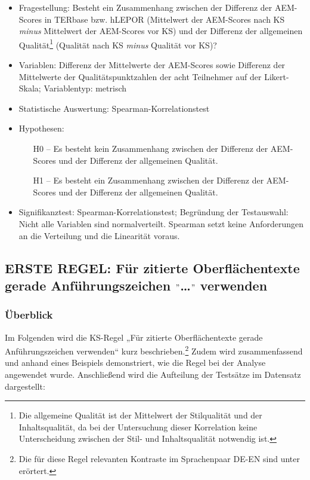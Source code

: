 \begin{itemize}
\item Fragestellung: Besteht ein Zusammenhang zwischen der Differenz der AEM-Scores in TERbase bzw. hLEPOR (Mittelwert der AEM-Scores nach KS \textit{minus} Mittelwert der AEM-Scores vor KS) und der Differenz der allgemeinen Qualität\footnote{{{{Die allgemeine Qualität ist der Mittelwert der Stilqualität und der Inhaltsqualität, da bei der Untersuchung dieser Korrelation keine Unterscheidung zwischen der Stil- und Inhaltsqualität notwendig ist.}}}} (Qualität nach KS \textit{minus} Qualität vor KS)?
\item Variablen: Differenz der Mittelwerte der AEM-Scores sowie Differenz der Mittelwerte der Qualitätspunktzahlen der acht Teilnehmer auf der Likert-Skala; Variablentyp: metrisch
\item Statistische Auswertung: Spearman-Korrelationstest
\item Hypothesen:
  \begin{itemize}[align = left]

  \item[H0 --] Es besteht kein Zusammenhang zwischen der Differenz der AEM-Scores und der Differenz der allgemeinen Qualität.

  \item[H1 --] Es besteht ein Zusammenhang zwischen der Differenz der AEM-Scores und der Differenz der allgemeinen Qualität.

  \end{itemize}
\item Signifikanztest: Spearman-Korrelationstest; Begründung der Testauswahl: Nicht alle Variablen sind normalverteilt. Spearman setzt keine Anforderungen an die Verteilung und die Linearität voraus.
\end{itemize}

\subsection{ERSTE REGEL: Für zitierte Oberflächentexte gerade Anführungszeichen $"$…$"$ verwenden}
\label{sec:5.3.1}

\subsubsection{\label{sec:5.3.1.0}Überblick}

Im Folgenden wird die KS-Regel „Für zitierte Oberflächentexte gerade Anführungszeichen verwenden“ kurz beschrieben.\footnote{{{{Die für diese Regel relevanten Kontraste im Sprachenpaar DE-EN sind unter  erörtert.} }}} Zudem wird zusammenfassend und anhand eines Beispiels demonstriert, wie die Regel bei der Analyse angewendet wurde. Anschließend wird die Aufteilung der Testsätze im Datensatz dargestellt:

